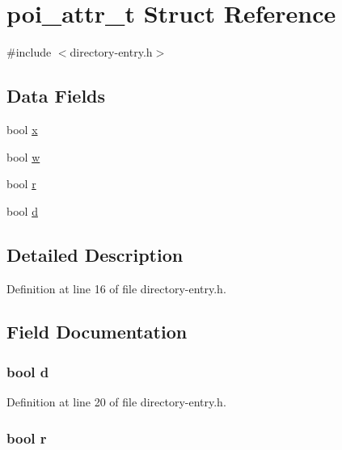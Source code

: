 \hypertarget{structpoi__attr__t}{\section{poi\-\_\-attr\-\_\-t Struct Reference}
\label{structpoi__attr__t}
}


{\ttfamily \#include $<$directory-\/entry.\-h$>$}

\subsection*{Data Fields}
\begin{DoxyCompactItemize}
\item 
bool \hyperlink{structpoi__attr__t_a946a8f8377210c472c7cbdf11f154280}{x}
\item 
bool \hyperlink{structpoi__attr__t_ac2e5f3b10af22c39ed83be143a508b80}{w}
\item 
bool \hyperlink{structpoi__attr__t_a904fc9328a7095487716875e4a892851}{r}
\item 
bool \hyperlink{structpoi__attr__t_a291ac6e121c27d3c9a71d995cf34685c}{d}
\end{DoxyCompactItemize}


\subsection{Detailed Description}


Definition at line 16 of file directory-\/entry.\-h.



\subsection{Field Documentation}
\hypertarget{structpoi__attr__t_a291ac6e121c27d3c9a71d995cf34685c}{
\subsubsection[{d}]{\setlength{\rightskip}{0pt plus 5cm}bool d}}\label{structpoi__attr__t_a291ac6e121c27d3c9a71d995cf34685c}


Definition at line 20 of file directory-\/entry.\-h.

\hypertarget{structpoi__attr__t_a904fc9328a7095487716875e4a892851}{
\subsubsection[{r}]{\setlength{\rightskip}{0pt plus 5cm}bool r}}\label{structpoi__attr__t_a904fc9328a7095487716875e4a892851}


